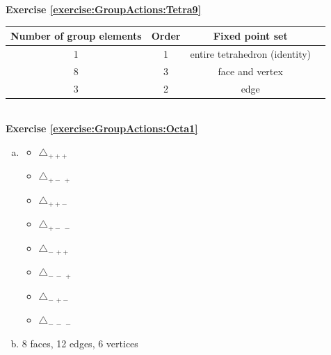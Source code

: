 \noindent\textbf{Exercise \ref{exercise:GroupActions:Tetra9}}
%  
\\
\begin{tabular}{| c |c|c| r |} \hline
\textbf{ Number of group elements} & \textbf{Order} & \textbf{Fixed point set} \\ \hline
 1&  1& entire tetrahedron (identity) \\ \hline
8 & 3 & face and vertex \\ \hline
 3 & 2 & edge \\ \hline
\end{tabular}
 \\

\noindent\textbf{Exercise \ref{exercise:GroupActions:Octa1}}
\begin{enumerate}[(a)]
\item
\begin{multicols}{4}
	\begin{itemize}
	\item
	$\triangle_{ +++}$
	
	\item
	$\triangle_{ +-\,+}$
	
	\item
	$\triangle_{ ++-\,}$
	
	\item
	$\triangle_{ +-\,-\,}$
	
	\item
	$\triangle_{-\,++}$
	
	\item
	$\triangle_{-\,-\,+}$
	
	\item
	$\triangle_{-\,+-\,}$
	
	\item
	$\triangle_{-\,-\,-\,}$
	\end{itemize}
	\end{multicols}
	
\item
8 faces, 12 edges, 6 vertices
\end{enumerate}

